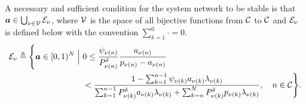 \begin{theorem} \label{TH:NEC_SUFF}
	A necessary and sufficient condition for the system network to be stable is that $\bm{a} \in \bigcup_{\nu\in\cal{V}} \cal{E}_\nu$, where $\cal{V}$ is the space of all bijective functions from $\cal{C}$ to $\cal{C}$ and $\cal{E}_\nu$ is defined below with the convention $\sum_{k=1}^0 \cdot = 0$.
	\begin{align} \label{eq:stab_long}
    	\cal{E}_{\nu} \triangleq \Bigg\{ \bm{a} \in [0,1)^N \Bigm\vert~ 
    	& 0 \le 
        \dfrac{\psi_{\nu(n)}}{P_{\nu(n)}^\delta}\dfrac{a_{\nu(n)}}{p_{\nu(n)}-a_{\nu(n)}} \nonumber\\
        & < \dfrac{ 1 - \sum_{k=1}^{n-1} \psi_{\nu(k)} a_{\nu(k)} \lambda_{\nu(k)} }
        {\sum_{k=1}^{n-1} P_{\nu(k)}^{\delta} a_{\nu(k)}\lambda_{\nu(k)} +
        \sum_{k=n}^N P_{\nu(k)}^\delta p_{\nu(k)}\lambda_{\nu(k)}},
        \quad n \in \cal{C} \Bigg\}.
    \end{align}
\end{theorem}
%
